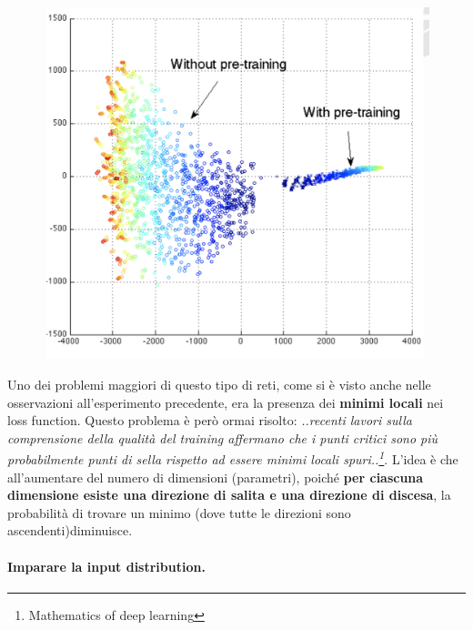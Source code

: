 \begin{itemize}
\begin{figure}[!h]
    \includegraphics[scale=.35]{images/representation_learning/obs02.png}
    \centering
  \end{figure}
\end{itemize}

Uno dei problemi maggiori di questo tipo di reti, come si è visto anche nelle osservazioni all'esperimento 
precedente, era la presenza dei \textbf{minimi locali} nei loss function. Questo problema è però ormai risolto:
\textit{..recenti lavori sulla comprensione della qualità del training affermano che i punti critici 
sono più probabilmente punti di sella rispetto ad essere minimi locali spuri..\footnote{Mathematics of deep
learning}}. L'idea è che all'aumentare del numero di dimensioni (parametri), poiché \textbf{per ciascuna 
dimensione esiste una direzione di salita e una direzione di discesa}, la probabilità di 
trovare un minimo (dove tutte le direzioni sono ascendenti)diminuisce.
\newpage
\paragraph{Imparare la input distribution.}  

